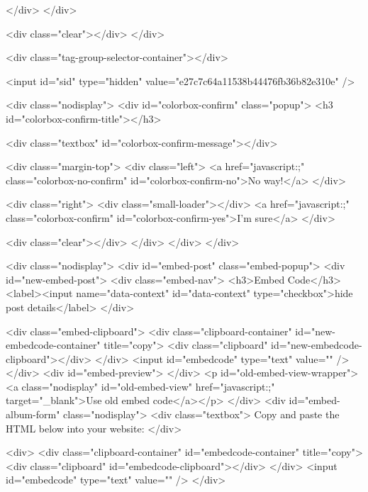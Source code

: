         </div>
        </div>

        <div class="clear"></div>
    </div>

    <div class="tag-group-selector-container"></div>

    <input id="sid" type="hidden" value="e27c7c64a11538b44476fb36b82e310e" />

    <div class="nodisplay">
	<div id="colorbox-confirm" class="popup">
		<h3 id="colorbox-confirm-title"></h3>
		
		<div class="textbox" id="colorbox-confirm-message"></div>

		<div class="margin-top">
			<div class="left">
				<a href="javascript:;" class="colorbox-no-confirm" id="colorbox-confirm-no">No way!</a>
			</div>
			
			<div class="right">
				<div class="small-loader"></div>
				<a href="javascript:;" class="colorbox-confirm" id="colorbox-confirm-yes">I'm sure</a>
			</div>
			
			<div class="clear"></div>
		</div>
	</div>
</div>

    <div class="nodisplay">
    <div id="embed-post" class="embed-popup">
        <div id="new-embed-post">
            <div class="embed-nav">
                <h3>Embed Code</h3>
                <label><input name="data-context" id="data-context" type="checkbox">hide post details</label>
            </div>

            <div class="embed-clipboard">
                <div class="clipboard-container" id="new-embedcode-container" title="copy">
                    <div class="clipboard" id="new-embedcode-clipboard"></div>
                </div>
                <input id="embedcode" type="text" value="" />
            </div>
            <div id="embed-preview">
            </div>
            <p id="old-embed-view-wrapper"><a class="nodisplay" id="old-embed-view" href="javascript:;" target="_blank">Use old embed code</a></p>
        </div>
        <div id="embed-album-form" class="nodisplay">
            <div class="textbox">
                Copy and paste the HTML below into your website:
            </div>

            <div>
                <div class="clipboard-container" id="embedcode-container" title="copy">
                    <div class="clipboard" id="embedcode-clipboard"></div>
                </div>
                <input id="embedcode" type="text" value="" />
            </div>


